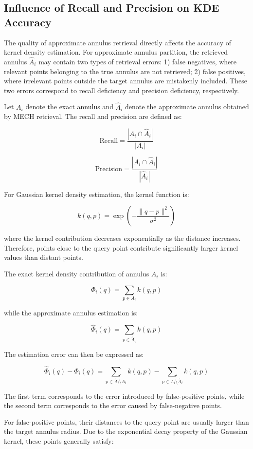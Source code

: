 \documentclass[conference]{IEEEtran}
\begin{document}
\subsection{Influence of Recall and Precision on KDE Accuracy}

The quality of approximate annulus retrieval directly affects the accuracy of kernel density estimation. 
For approximate annulus partition, the retrieved annulus $\hat{A}_i$ may contain two types of retrieval errors: 
1) false negatives, where relevant points belonging to the true annulus are not retrieved; 
2) false positives, where irrelevant points outside the target annulus are mistakenly included. 
These two errors correspond to recall deficiency and precision deficiency, respectively.

Let $A_i$ denote the exact annulus and $\hat{A}_i$ denote the approximate annulus obtained by MECH retrieval. 
The recall and precision are defined as:

\[
\mathrm{Recall}
=
\frac{|A_i \cap \hat{A}_i|}{|A_i|}
\]

\[
\mathrm{Precision}
=
\frac{|A_i \cap \hat{A}_i|}{|\hat{A}_i|}
\]

For Gaussian kernel density estimation, the kernel function is:

\[
k(q,p)
=
\exp\left(
-\frac{\|q-p\|^2}{\sigma^2}
\right)
\]

where the kernel contribution decreases exponentially as the distance increases. 
Therefore, points close to the query point contribute significantly larger kernel values than distant points.

The exact kernel density contribution of annulus $A_i$ is:

\[
\Phi_i(q)
=
\sum_{p \in A_i} k(q,p)
\]

while the approximate annulus estimation is:

\[
\hat{\Phi}_i(q)
=
\sum_{p \in \hat{A}_i} k(q,p)
\]

The estimation error can then be expressed as:

\[
\hat{\Phi}_i(q)-\Phi_i(q)
=
\sum_{p\in \hat{A}_i\setminus A_i}k(q,p)
-
\sum_{p\in A_i\setminus \hat{A}_i}k(q,p)
\]

The first term corresponds to the error introduced by false-positive points, while the second term corresponds to the error caused by false-negative points.

For false-positive points, their distances to the query point are usually larger than the target annulus radius. 
Due to the exponential decay property of the Gaussian kernel, these points generally satisfy:
\end{document}
